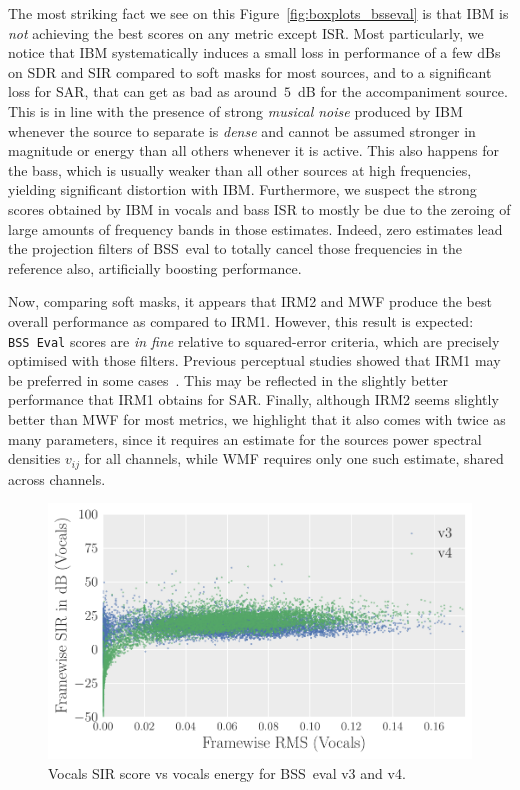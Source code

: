 \documentclass{llncs}
\begin{document}
The most striking fact we see on this Figure~\ref{fig:boxplots_bsseval} is that IBM is \textit{not} achieving the best scores on any metric except ISR. Most particularly, we notice that IBM systematically induces a small loss in performance of a few dBs on SDR and SIR compared to soft masks for most sources, and to a significant loss for SAR, that can get as bad as around~$5$~dB for the accompaniment source. This is in line with the presence of strong \textit{musical noise} produced by IBM whenever the source to separate is \textit{dense} and cannot be assumed stronger in magnitude or energy than all others whenever it is active. This also happens for the bass, which is usually weaker than all other sources at high frequencies, yielding significant distortion with IBM. Furthermore, we suspect the strong scores obtained by IBM in vocals and bass ISR to mostly be due to the zeroing of large amounts of frequency bands in those estimates. Indeed, zero estimates lead the projection filters of BSS~eval to totally cancel those frequencies in the reference also, artificially boosting performance.

Now, comparing soft masks, it appears that IRM2 and MWF produce the best overall performance as compared to IRM1. However, this result is expected: \texttt{BSS~Eval} scores are \textit{in fine} relative to squared-error criteria, which are precisely optimised with those filters. Previous perceptual studies showed that IRM1 may be preferred in some cases~\cite{liutkus15}. This may be reflected in the slightly better performance that IRM1 obtains for SAR. Finally, although IRM2 seems slightly better than MWF for most metrics, we highlight that it also comes with twice as many parameters, since it requires an estimate for the sources power spectral densities $v_{ij}$ for all channels, while WMF requires only one such estimate, shared across channels.


\begin{figure}[ht]
  \begin{center}
     \includegraphics[width=0.7\linewidth]{fig/evaluation_v3v4.pdf}
     \vspace{-1cm}
  \end{center}
  \caption{Vocals SIR score vs vocals energy for BSS~eval v3 and v4.  }
  \label{fig:v3v4}
\end{figure}
\end{document}
